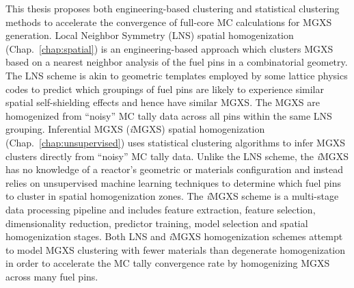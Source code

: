 This thesis proposes both engineering-based clustering and statistical clustering methods to accelerate the convergence of full-core \ac{MC} calculations for \ac{MGXS} generation. Local Neighbor Symmetry (LNS) spatial homogenization (Chap.~\ref{chap:spatial}) is an engineering-based approach which clusters \ac{MGXS} based on a nearest neighbor analysis of the fuel pins in a combinatorial geometry. The \ac{LNS} scheme is akin to geometric templates employed by some lattice physics codes to predict which groupings of fuel pins are likely to experience similar spatial self-shielding effects and hence have similar \ac{MGXS}. The MGXS are homogenized from ``noisy'' \ac{MC} tally data across all pins within the same \ac{LNS} grouping. Inferential \ac{MGXS} (\textit{i}\ac{MGXS}) spatial homogenization (Chap.~\ref{chap:unsupervised}) uses statistical clustering algorithms to infer \ac{MGXS} clusters directly from ``noisy'' \ac{MC} tally data. Unlike the \ac{LNS} scheme, the \textit{i}\ac{MGXS} has no knowledge of a reactor's geometric or materials configuration and instead relies on unsupervised machine learning techniques to determine which fuel pins to cluster in spatial homogenization zones. The \textit{i}\ac{MGXS} scheme is a multi-stage data processing pipeline and includes feature extraction, feature selection, dimensionality reduction, predictor training, model selection and spatial homogenization stages. Both \ac{LNS} and \textit{i}\ac{MGXS} homogenization schemes attempt to model \ac{MGXS} clustering with fewer materials than degenerate homogenization in order to accelerate the \ac{MC} tally convergence rate by homogenizing \ac{MGXS} across many fuel pins.



